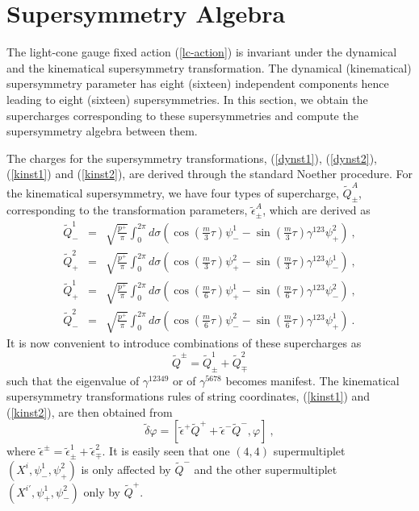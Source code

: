 \documentclass[a4paper,12pt]{article}
\begin{document}
\section{Supersymmetry Algebra}

The light-cone gauge fixed action (\ref{lc-action}) is invariant under
the dynamical and the kinematical supersymmetry transformation.  The
dynamical (kinematical) supersymmetry parameter has eight (sixteen)
independent components hence leading to eight (sixteen)
supersymmetries.  In this section, we obtain the supercharges
corresponding to these supersymmetries and compute the supersymmetry
algebra between them.

The charges for the supersymmetry transformations, (\ref{dynst1}),
(\ref{dynst2}), (\ref{kinst1}) and (\ref{kinst2}), are derived through
the standard Noether procedure.  For the kinematical supersymmetry, we
have four types of supercharge, $\widetilde{Q}^A_\pm$, corresponding
to the transformation parameters, $\tilde{\epsilon}^A_\pm$, which are
derived as
\begin{eqnarray}
\widetilde{Q}^1_-
  &=& \sqrt{ \frac{p^+}{\pi} } \int^{2 \pi}_0 d \sigma
      \left( \cos \left( \frac{m}{3} \tau \right)
               \psi^1_-
            -\sin \left( \frac{m}{3} \tau \right) \gamma^{123}
               \psi^2_+
      \right) ~,
\nonumber \\
\widetilde{Q}^2_+
  &=& \sqrt{ \frac{p^+}{\pi} } \int^{2 \pi}_0 d \sigma
      \left( \cos \left( \frac{m}{3} \tau \right)
               \psi^2_+
            -\sin \left( \frac{m}{3} \tau \right) \gamma^{123}
               \psi^1_-
      \right) ~,
\nonumber \\
\widetilde{Q}^1_+
  &=& \sqrt{ \frac{p^+}{\pi} } \int^{2 \pi}_0 d \sigma
      \left( \cos \left( \frac{m}{6} \tau \right)
               \psi^1_+
            -\sin \left( \frac{m}{6} \tau \right) \gamma^{123}
               \psi^2_-
      \right) ~,
\nonumber \\
\widetilde{Q}^2_-
  &=& \sqrt{ \frac{p^+}{\pi} } \int^{2 \pi}_0 d \sigma
      \left( \cos \left( \frac{m}{6} \tau \right)
               \psi^2_-
            -\sin \left( \frac{m}{6} \tau \right) \gamma^{123}
               \psi^1_+
      \right) ~.
\label{kcharge}
\end{eqnarray}
It is now convenient to introduce combinations of these supercharges
as
\begin{equation}
\widetilde{Q}^\pm = \widetilde{Q}^1_\pm + \widetilde{Q}^2_\mp
\end{equation}
such that the eigenvalue of $\gamma^{12349}$ or of $\gamma^{5678}$
becomes manifest.  The kinematical supersymmetry transformations rules
of string coordinates, (\ref{kinst1}) and (\ref{kinst2}), are then
obtained from
\begin{equation}
\tilde{\delta} \varphi 
 = [ \tilde{\epsilon}^+ \widetilde{Q}^+
    +\tilde{\epsilon}^- \widetilde{Q}^- , \varphi ] ~,
\end{equation}
where $\tilde{\epsilon}^\pm = \tilde{\epsilon}^1_\pm +
\tilde{\epsilon}^2_\mp$.  It is easily seen that one $(4,4)$
supermultiplet $(X^i, \psi^1_-, \psi^2_+)$ is only affected by
$\widetilde{Q}^-$ and the other supermultiplet $(X^{i'}, \psi^1_+,
\psi^2_-)$ only by $\widetilde{Q}^+$.
\end{document}
